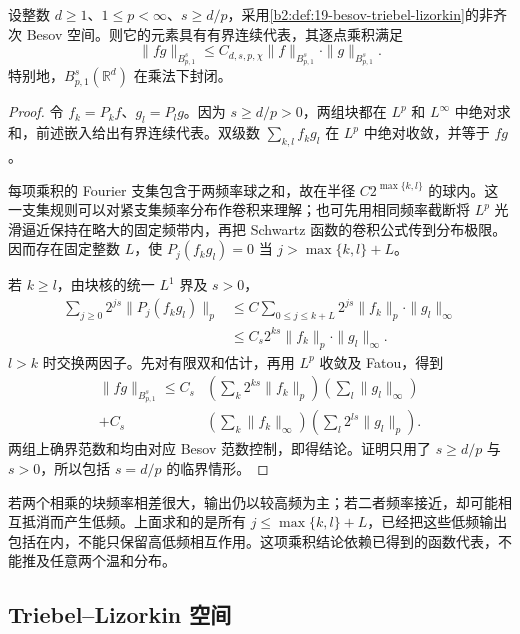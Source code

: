 \begin{proposition}\label{b2:prop:19-besov-algebra}
设整数 \(d\geq1\)、\(1\leq p<\infty\)、\(s\geq d/p\)，采用\cref{b2:def:19-besov-triebel-lizorkin}的非齐次 Besov 空间。则它的元素具有有界连续代表，其逐点乘积满足
\[
 \|fg\|_{B^s_{p,1}}
 \leq C_{d,s,p,\chi}\|f\|_{B^s_{p,1}}\cdot\|g\|_{B^s_{p,1}}.
\]
特别地，\(B^s_{p,1}(\mathbb R^d)\) 在乘法下封闭。
\end{proposition}
\begin{proof}
令 \(f_k=P_kf\)、\(g_l=P_lg\)。因为 \(s\geq d/p>0\)，两组块都在 \(L^p\) 和 \(L^\infty\) 中绝对求和，前述嵌入给出有界连续代表。双级数 \(\sum_{k,l}f_kg_l\) 在 \(L^p\) 中绝对收敛，并等于 \(fg\)。

每项乘积的 Fourier 支集包含于两频率球之和，故在半径 \(C2^{\max\{k,l\}}\) 的球内。这一支集规则可以对紧支集频率分布作卷积来理解；也可先用相同频率截断将 \(L^p\) 光滑逼近保持在略大的固定频带内，再把 Schwartz 函数的卷积公式传到分布极限。因而存在固定整数 \(L\)，使 \(P_j(f_kg_l)=0\) 当 \(j>\max\{k,l\}+L\)。

若 \(k\geq l\)，由块核的统一 \(L^1\) 界及 \(s>0\)，
\[
 \begin{aligned}
 \sum_{j\geq0}2^{js}\|P_j(f_kg_l)\|_p
 &\leq C\sum_{0\leq j\leq k+L}2^{js}\|f_k\|_p\cdot\|g_l\|_\infty\\
 &\leq C_s2^{ks}\|f_k\|_p\cdot\|g_l\|_\infty.
 \end{aligned}
\]
\(l>k\) 时交换两因子。先对有限双和估计，再用 \(L^p\) 收敛及 Fatou，得到
\[
 \begin{aligned}
 \|fg\|_{B^s_{p,1}}
 \leq C_s&\left(\sum_k2^{ks}\|f_k\|_p\right)
          \left(\sum_l\|g_l\|_\infty\right)\\
 +C_s&\left(\sum_k\|f_k\|_\infty\right)
          \left(\sum_l2^{ls}\|g_l\|_p\right).
 \end{aligned}
\]
两组上确界范数和均由对应 Besov 范数控制，即得结论。证明只用了 \(s\geq d/p\) 与 \(s>0\)，所以包括 \(s=d/p\) 的临界情形。
\end{proof}
若两个相乘的块频率相差很大，输出仍以较高频为主；若二者频率接近，却可能相互抵消而产生低频。上面求和的是所有 \(j\leq\max\{k,l\}+L\)，已经把这些低频输出包括在内，不能只保留高低频相互作用。这项乘积结论依赖已得到的函数代表，不能推及任意两个温和分布。

\subsection{Triebel--Lizorkin 空间}
\label{b2:subsec:190504}

